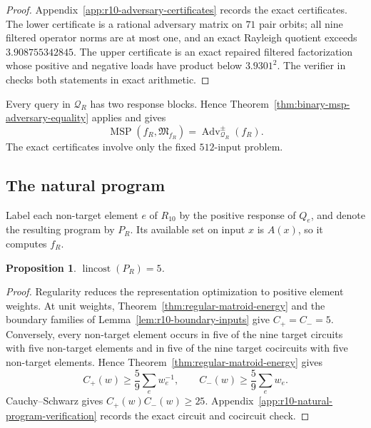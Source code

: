 \documentclass[11pt]{article}
\numberwithin{equation}{section}
\newtheorem{proposition}[definition]{Proposition}
\theoremstyle{remark}
\begin{document}
\begin{proof}
Appendix~\ref{app:r10-adversary-certificates} records the exact certificates.
The lower certificate is a rational adversary matrix on $71$ pair orbits;
all nine filtered operator norms are at most one, and an exact Rayleigh
quotient exceeds $3.908755342845$. The upper certificate is an exact repaired
filtered factorization whose positive and negative loads have product below
$3.9301^2$. The verifier in
 checks both statements in
exact arithmetic.
\end{proof}

Every query in $\mathcal Q_R$ has two response blocks. Hence
Theorem~\ref{thm:binary-msp-adversary-equality} applies and gives
\begin{equation}
    \operatorname{MSP}(f_R,\mathfrak M_{f_R})
    =\operatorname{Adv}^{\pm}_{\mathcal Q_R}(f_R).
\end{equation}
The exact certificates involve only the fixed $512$-input problem.

\subsection{The natural program}
\label{subsec:r10-program-calculation}

Label each non-target element $e$ of $R_{10}$ by the positive response of
$Q_e$, and denote the resulting program by $P_R$. Its available set on input
$x$ is $A(x)$, so it computes $f_R$.

\begin{proposition}
\label{prop:r10-natural-program-cost}
$\operatorname{lincost}(P_R)=5$.
\end{proposition}

\begin{proof}
Regularity reduces the representation optimization to positive element
weights. At unit weights, Theorem~\ref{thm:regular-matroid-energy} and the
boundary families of Lemma~\ref{lem:r10-boundary-inputs} give
$C_+=C_-=5$. Conversely, every non-target element occurs in five of the nine
target circuits with five non-target elements and in five of the nine target
cocircuits with five non-target elements. Hence Theorem~\ref{thm:regular-matroid-energy} gives
\begin{equation}
    C_+(w)\geq\frac{5}{9}\sum_e w_e^{-1},
    \qquad
    C_-(w)\geq\frac{5}{9}\sum_e w_e.
\end{equation}
Cauchy--Schwarz gives $C_+(w)C_-(w)\geq25$.
Appendix~\ref{app:r10-natural-program-verification} records the exact circuit
and cocircuit check.
\end{proof}
\end{document}
